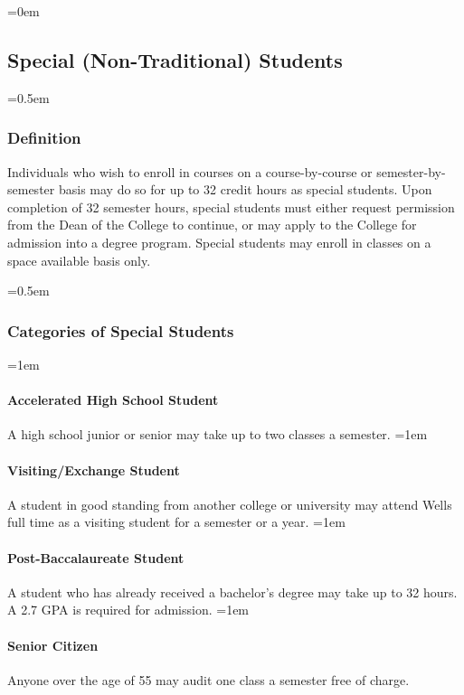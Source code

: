 \documentclass{manual}
\newcommand{\oldbreak}[1]{}
\let\oldsubsection\subsection
\renewcommand\subsection{\leftskip=0em\oldsubsection}
\let\oldsubsubsection\subsubsection
\renewcommand\subsubsection{\leftskip=0.5em\oldsubsubsection}
\let\oldparagraph\paragraph
\renewcommand\paragraph{\leftskip=1em\oldparagraph}
\begin{document}
\subsection{Special (Non-Traditional) Students}\label{sec:NonTraditionalStudents}

\subsubsection{Definition}

Individuals who wish to enroll in courses on a course-by-course or semester-by-semester basis may do so for up to 32 credit hours as special students. Upon completion of 32 semester hours, special students must either request permission from the Dean of the College to continue, or may apply to the College for admission into a degree program. Special students may enroll in classes on a space available basis only.

\subsubsection{Categories of Special Students}\label{sub:CategoriesOfSpecialStudents}

\paragraph{Accelerated High School Student} A high school junior or senior may take up to two classes a semester.
\paragraph{Visiting/Exchange Student} A student in good standing from another college or university may attend Wells full time as a visiting student for a semester or a year.
\paragraph{Post-Baccalaureate Student} A student who has already received a bachelor's degree may take up to 32 hours. A 2.7 GPA is required for admission. 
\paragraph{Senior Citizen} Anyone over the age of 55 may audit one class a semester free of charge.

\oldbreak{X-1}

\end{document}
